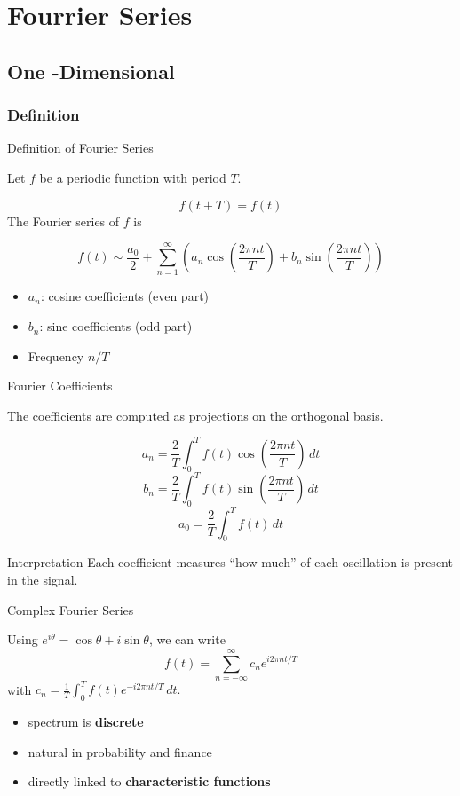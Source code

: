 \documentclass[aspectratio=169]{beamer}
\begin{document}
\section{Fourrier Series}

\subsection{One -Dimensional}

\subsubsection{Definition}

\begin{frame}{Definition of Fourier Series}

Let \(f\) be a periodic function with period \(T\).

\[
f(t+T)=f(t)
\]
\pause
The Fourier series of \(f\) is

\[
f(t) \sim \frac{a_0}{2}
+ \sum_{n=1}^{\infty}
\left(
a_n \cos\left(\frac{2\pi n t}{T}\right)
+
b_n \sin\left(\frac{2\pi n t}{T}\right)
\right)
\]
\pause
\begin{itemize}
    \item \(a_n\): cosine coefficients (even part)
    \item \(b_n\): sine coefficients (odd part)
    \item Frequency \(n/T\)
\end{itemize}

\end{frame}

\begin{frame}{Fourier Coefficients}

The coefficients are computed as projections on the orthogonal basis.

\[
a_n = \frac{2}{T}\int_{0}^{T}
f(t)\cos\left(\frac{2\pi n t}{T}\right)\,dt
\]
\pause
\[
b_n = \frac{2}{T}\int_{0}^{T}
f(t)\sin\left(\frac{2\pi n t}{T}\right)\,dt
\]
\pause
\[
a_0 = \frac{2}{T}\int_{0}^{T} f(t)\,dt
\]

\begin{block}{Interpretation}
Each coefficient measures ``how much'' of each oscillation is present in the signal.
\end{block}

\end{frame}

\begin{frame}{Complex Fourier Series}

Using $
e^{i\theta}=\cos\theta + i\sin\theta
$, we can write
\[
f(t)=\sum_{n=-\infty}^{\infty} c_n e^{i 2\pi n t/T}
\]
with $
c_n=\frac{1}{T}\int_{0}^{T}
f(t)e^{-i 2\pi n t/T}\, dt
.$
\pause
\begin{itemize}
    \item spectrum is \textbf{discrete}
    \item natural in probability and finance
    \item directly linked to \textbf{characteristic functions}
\end{itemize}

\end{frame}
\end{document}

